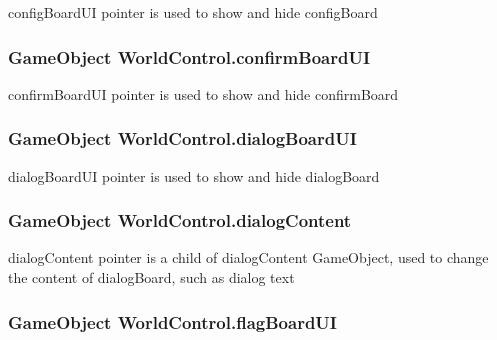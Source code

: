 config\+Board\+UI pointer is used to show and hide config\+Board 

\subsubsection[{\texorpdfstring{confirm\+Board\+UI}{confirmBoardUI}}]{\setlength{\rightskip}{0pt plus 5cm}Game\+Object World\+Control.\+confirm\+Board\+UI}\hypertarget{class_world_control_a0feda681f4f39a069968cc36cd34f84e}{}\label{class_world_control_a0feda681f4f39a069968cc36cd34f84e}


confirm\+Board\+UI pointer is used to show and hide confirm\+Board 

\subsubsection[{\texorpdfstring{dialog\+Board\+UI}{dialogBoardUI}}]{\setlength{\rightskip}{0pt plus 5cm}Game\+Object World\+Control.\+dialog\+Board\+UI}\hypertarget{class_world_control_ae4ce29fc615324ada4f6d68d96c3bc45}{}\label{class_world_control_ae4ce29fc615324ada4f6d68d96c3bc45}


dialog\+Board\+UI pointer is used to show and hide dialog\+Board 

\subsubsection[{\texorpdfstring{dialog\+Content}{dialogContent}}]{\setlength{\rightskip}{0pt plus 5cm}Game\+Object World\+Control.\+dialog\+Content}\hypertarget{class_world_control_af567a39e5e1822cec6de7fd1cd7f55ea}{}\label{class_world_control_af567a39e5e1822cec6de7fd1cd7f55ea}


dialog\+Content pointer is a child of dialog\+Content Game\+Object, used to change the content of dialog\+Board, such as dialog text 

\subsubsection[{\texorpdfstring{flag\+Board\+UI}{flagBoardUI}}]{\setlength{\rightskip}{0pt plus 5cm}Game\+Object World\+Control.\+flag\+Board\+UI}\hypertarget{class_world_control_a3a5cb853f246f79c03ae105529601cb0}{}\label{class_world_control_a3a5cb853f246f79c03ae105529601cb0}


